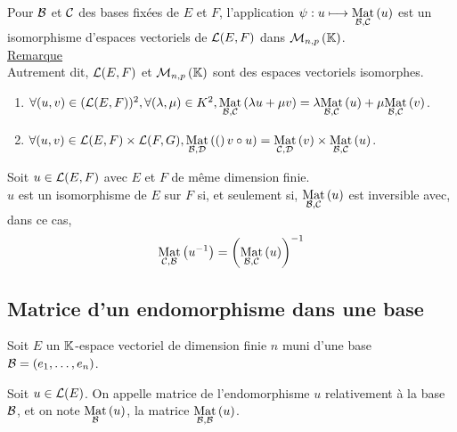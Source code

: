 \begin{defprop}
    Pour \(\cal{B}\) et \(\cal{C}\) des bases fixées de \(E\) et \(F\), l’application \(\psi : u \mapsto \Mat{\cal{B}, \cal{C}}{u}\) est un isomorphisme d’espaces vectoriels de \(\cal{L}(E, F )\) dans \(\M{n,p}\).\\
    \underline{Remarque} \\
    Autrement dit, \(\cal{L}(E, F )\) et \(\M{n,p}\) sont des espaces vectoriels isomorphes.
\end{defprop}


\begin{defprop}
    \begin{enumerate}
        \item \(\forall(u, v) \in (\cal{L}(E, F ))^2 , \forall(\lambda, \mu) \in K^2, \Mat{\cal{B}, \cal{C}}{\lambda u + \mu v} = \lambda \Mat{\cal{B}, \cal{C}}{u} + \mu \Mat{\cal{B}, \cal{C}}{v}\).
        \item \(\forall(u, v) \in \cal{L}(E, F ) \times \cal{L}(F, G), \Mat{\cal{B}, \cal{D}} (v \circ u) = \Mat{\cal{C}, \cal{D}}{v} \times \Mat{\cal{B}, \cal{C}}{u}\).
    \end{enumerate}
\end{defprop}

\begin{defprop}
    Soit \(u \in \cal{L}(E, F )\) avec \(E\) et \(F\) de même dimension finie.\\
    \(u\) est un isomorphisme de \(E\) sur \(F\) si, et seulement si, \(\Mat{\cal{B}, \cal{C}}{u}\) est inversible avec, dans ce cas,
    \[\Mat{\cal{C}, \cal{B}}{u^{-1}} =\paren{\Mat{\cal{B}, \cal{C}}{u}}^{-1}\]

\end{defprop}

\subsection{Matrice d’un endomorphisme dans une base}
    Soit \(E\) un \(\K\)-espace vectoriel de dimension finie \(n\) muni d’une base \(\cal{B} = (e_1, \dots , e_n)\).

\begin{defi}
    Soit \(u \in \cal{L}(E)\).
    On appelle matrice de l’endomorphisme \(u\) relativement à la base \(\cal{B}\), et on note \(\Mat{\cal{B}}{u}\), la matrice \(\Mat{\cal{B}, \cal{B}}{u}\).  
\end{defi}

